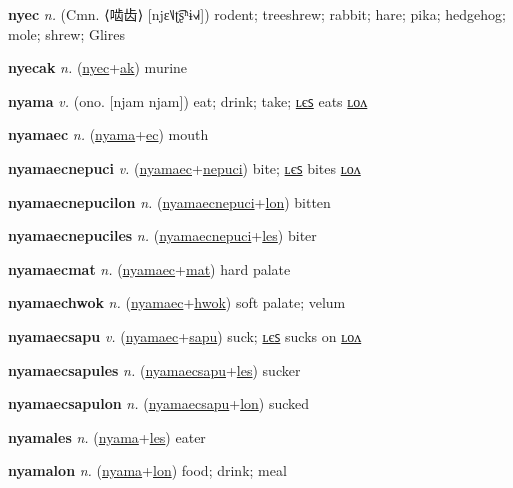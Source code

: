 \textbf{\hypertarget{nyec}{nyec}} \textit{n.} (Cmn. ⟨{\chinese{}啮齿}⟩ [njɛ˥˩ʈ͡ʂʰɨ˧˩˧])
rodent; treeshrew; rabbit; hare; pika; hedgehog; mole; shrew; Glires

\textbf{\hypertarget{nyecak}{nyecak}} \textit{n.} (\hyperlink{nyec}{nyec}+\allowbreak \hyperlink{ak}{ak})
murine

\textbf{\hypertarget{nyama}{nyama}} \textit{v.} (ono. [njam njam])
eat; drink; take; \hyperlink{nyamales}{ʟєꜱ} eats \hyperlink{nyamalon}{ʟᴏᴧ}

\textbf{\hypertarget{nyamaec}{nyamaec}} \textit{n.} (\hyperlink{nyama}{nyama}+\allowbreak \hyperlink{ec}{ec})
mouth

\textbf{\hypertarget{nyamaecnepuci}{nyamaecnepuci}} \textit{v.} (\hyperlink{nyamaec}{nyamaec}+\allowbreak \hyperlink{nepuci}{nepuci})
bite; \hyperlink{nyamaecnepuciles}{ʟєꜱ} bites \hyperlink{nyamaecnepucilon}{ʟᴏᴧ}

\textbf{\hypertarget{nyamaecnepucilon}{nyamaecnepucilon}} \textit{n.} (\hyperlink{nyamaecnepuci}{nyamaecnepuci}+\allowbreak \hyperlink{lon}{lon})
bitten

\textbf{\hypertarget{nyamaecnepuciles}{nyamaecnepuciles}} \textit{n.} (\hyperlink{nyamaecnepuci}{nyamaecnepuci}+\allowbreak \hyperlink{les}{les})
biter

\textbf{\hypertarget{nyamaecmat}{nyamaecmat}} \textit{n.} (\hyperlink{nyamaec}{nyamaec}+\allowbreak \hyperlink{mat}{mat})
hard palate

\textbf{\hypertarget{nyamaechwok}{nyamaechwok}} \textit{n.} (\hyperlink{nyamaec}{nyamaec}+\allowbreak \hyperlink{hwok}{hwok})
soft palate; velum

\textbf{\hypertarget{nyamaecsapu}{nyamaecsapu}} \textit{v.} (\hyperlink{nyamaec}{nyamaec}+\allowbreak \hyperlink{sapu}{sapu})
suck; \hyperlink{nyamaecsapules}{ʟєꜱ} sucks on \hyperlink{nyamaecsapulon}{ʟᴏᴧ}

\textbf{\hypertarget{nyamaecsapules}{nyamaecsapules}} \textit{n.} (\hyperlink{nyamaecsapu}{nyamaecsapu}+\allowbreak \hyperlink{les}{les})
sucker

\textbf{\hypertarget{nyamaecsapulon}{nyamaecsapulon}} \textit{n.} (\hyperlink{nyamaecsapu}{nyamaecsapu}+\allowbreak \hyperlink{lon}{lon})
sucked

\textbf{\hypertarget{nyamales}{nyamales}} \textit{n.} (\hyperlink{nyama}{nyama}+\allowbreak \hyperlink{les}{les})
eater

\textbf{\hypertarget{nyamalon}{nyamalon}} \textit{n.} (\hyperlink{nyama}{nyama}+\allowbreak \hyperlink{lon}{lon})
food; drink; meal

